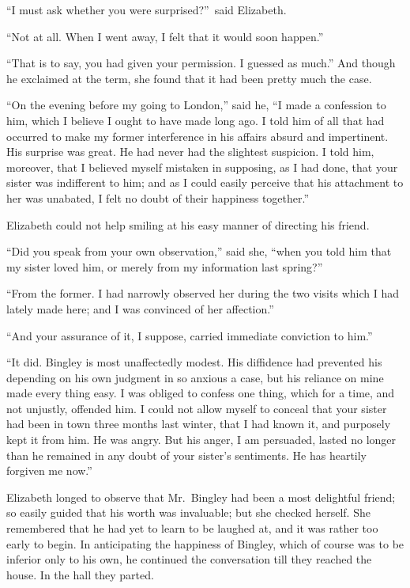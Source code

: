 \documentclass[12pt,english,oneside]{book}
\begin{document}
{}``I must ask whether you were surprised?''\ said Elizabeth.

{}``Not at all. When I went away, I felt that it would soon happen.''

{}``That is to say, you had given your permission. I guessed as much.''
And though he exclaimed at the term, she found that it had been pretty
much the case.

{}``On the evening before my going to London,'' said he, {}``I
made a confession to him, which I believe I ought to have made long
ago. I told him of all that had occurred to make my former interference
in his affairs absurd and impertinent. His surprise was great. He
had never had the slightest suspicion. I told him, moreover, that
I believed myself mistaken in supposing, as I had done, that your
sister was indifferent to him; and as I could easily perceive that
his attachment to her was unabated, I felt no doubt of their happiness
together.''

Elizabeth could not help smiling at his easy manner of directing his
friend.

{}``Did you speak from your own observation,'' said she, {}``when
you told him that my sister loved him, or merely from my information
last spring?''\


{}``From the former. I had narrowly observed her during the two visits
which I had lately made here; and I was convinced of her affection.''

{}``And your assurance of it, I suppose, carried immediate conviction
to him.''

{}``It did. Bingley is most unaffectedly modest. His diffidence had
prevented his depending on his own judgment in so anxious a case,
but his reliance on mine made every thing easy. I was obliged to confess
one thing, which for a time, and not unjustly, offended him. I could
not allow myself to conceal that your sister had been in town three
months last winter, that I had known it, and purposely kept it from
him. He was angry. But his anger, I am persuaded, lasted no longer
than he remained in any doubt of your sister's sentiments. He has
heartily forgiven me now.''

Elizabeth longed to observe that Mr.\ Bingley had been a most delightful
friend; so easily guided that his worth was invaluable; but she checked
herself. She remembered that he had yet to learn to be laughed at,
and it was rather too early to begin. In anticipating the happiness
of Bingley, which of course was to be inferior only to his own, he
continued the conversation till they reached the house. In the hall
they parted.
\end{document}

